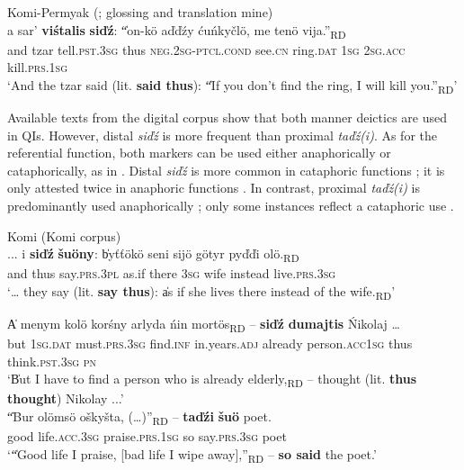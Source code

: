 \documentclass[output=paper,colorlinks,citecolor=brown]{langscibook}
\begin{document}
\ea\label{ex:teptiuk:19} Komi-Permyak (\citealt[40]{Uotila1985}; glossing and translation mine)\\
\gll a sar’ \textbf{viśtalis} \textbf{siďź}: \|“on-kö aďďźy ćuńkyčlö, me tenö vija.”\|\textsubscript{RD}\\
 and tzar tell.\textsc{pst.3sg} thus {\db}{\db}\textsc{neg.2sg-ptcl.cond} see.\textsc{cn} ring.\textsc{dat} 1\textsc{sg} 2\textsc{sg.acc} kill.\textsc{prs.1sg}\\
\glt ‘And the tzar said (lit. \textbf{said thus}): \|“If you don’t find the ring, I will kill you.”\|\textsubscript{RD}’
\z

Available texts from the digital corpus show that both manner deictics are used in QIs. However, distal \textit{siďź} is more frequent than proximal \textit{taďź(i)}. As for the referential function, both markers can be used either anaphorically or cataphorically, as in . Distal \textit{siďź} is more common in cataphoric functions ; it is only attested twice in anaphoric functions . In contrast, proximal \textit{taďź(i)} is predominantly used anaphorically ; only some instances reflect a cataphoric use .

\ea\label{ex:teptiuk:20} {Komi (Komi corpus)}\\
\ea\label{ex:teptiuk:20a}
\gll ... i \textbf{siďź} \textbf{šuöny}: \|byťťökö seni sijö götyr pyďďi olö.\|\textsubscript{RD}\\
{} and thus say.\textsc{prs.3pl} {\db}as.if there 3\textsc{sg} wife instead live.\textsc{prs.3sg}\\
\glt ‘… they say (lit. \textbf{say thus}): \|as if she lives there instead of the wife.\|\textsubscript{RD}’

\ex\label{ex:teptiuk:20b}
\gll \|A menym kolö korśny arlyda ńin mortös\|\textsubscript{RD} – \textbf{siďź} \textbf{dumajtis} \'{N}ikolaj … \\
{\db}but 1\textsc{sg}.\textsc{dat} must.\textsc{prs}.3\textsc{sg} find.\textsc{inf}  {in.years.}\textsc{adj} already person.\textsc{acc}{1}\textsc{sg} {} {thus}  {think.}\textsc{pst}{.3}\textsc{sg} \textsc{pn}\\
\glt ‘\|But I have to find a person who is already elderly,\|\textsubscript{RD} – thought (lit. \textbf{thus thought}) Nikolay ...’\\

\ex\label{ex:teptiuk:20c}
 \gll \|“Bur olömsö oškyšta, (…)”\|\textsubscript{RD} – \textbf{taďźi} \textbf{šuö} poet.\\
{\db}{\db}good life.\textsc{acc.3sg} praise.\textsc{prs.1sg} {} {} so say.\textsc{prs}.3\textsc{sg} poet\\
\glt ‘\|“Good life I praise, [bad life I wipe away],”\|\textsubscript{RD} – \textbf{so said} the poet.’
\end{document}
